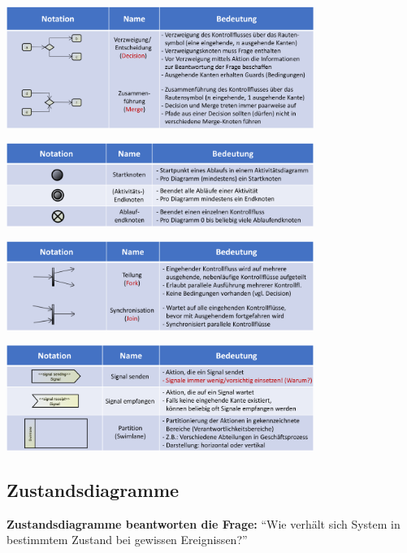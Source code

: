 \documentclass[11pt, a4paper]{article}
\begin{document}
\vspace{1em}

\centering
\includegraphics[width=0.75\textwidth]{Aktivitaet-Tabellen/2.png}

\vspace{1em}

\centering
\includegraphics[width=0.75\textwidth]{Aktivitaet-Tabellen/3.png}

\vspace{1em}

\centering
\includegraphics[width=0.75\textwidth]{Aktivitaet-Tabellen/4.png}

\vspace{1em}

\centering
\includegraphics[width=0.75\textwidth]{Aktivitaet-Tabellen/5.png}

\newpage

\raggedright \subsection{Zustandsdiagramme}

\textbf{Zustandsdiagramme beantworten die Frage:} “Wie verhält sich System in bestimmtem Zustand bei gewissen Ereignissen?”
\end{document}
